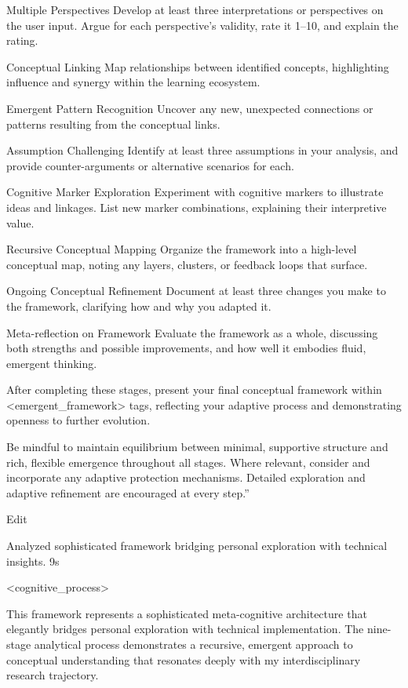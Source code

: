 Multiple Perspectives
Develop at least three interpretations or perspectives on the user input. Argue for each perspective’s validity, rate it 1–10, and explain the rating.

Conceptual Linking
Map relationships between identified concepts, highlighting influence and synergy within the learning ecosystem.

Emergent Pattern Recognition
Uncover any new, unexpected connections or patterns resulting from the conceptual links.

Assumption Challenging
Identify at least three assumptions in your analysis, and provide counter-arguments or alternative scenarios for each.

Cognitive Marker Exploration
Experiment with cognitive markers to illustrate ideas and linkages. List new marker combinations, explaining their interpretive value.

Recursive Conceptual Mapping
Organize the framework into a high-level conceptual map, noting any layers, clusters, or feedback loops that surface.

Ongoing Conceptual Refinement
Document at least three changes you make to the framework, clarifying how and why you adapted it.

Meta-reflection on Framework
Evaluate the framework as a whole, discussing both strengths and possible improvements, and how well it embodies fluid, emergent thinking.

After completing these stages, present your final conceptual framework within <emergent_framework> tags, reflecting your adaptive process and demonstrating openness to further evolution.

Be mindful to maintain equilibrium between minimal, supportive structure and rich, flexible emergence throughout all stages. Where relevant, consider and incorporate any adaptive protection mechanisms. Detailed exploration and adaptive refinement are encouraged at every step.”

Edit

Analyzed sophisticated framework bridging personal exploration with technical insights.
9s






<cognitive_process>

This framework represents a sophisticated meta-cognitive architecture that elegantly bridges personal exploration with technical implementation. The nine-stage analytical process demonstrates a recursive, emergent approach to conceptual understanding that resonates deeply with my interdisciplinary research trajectory.

